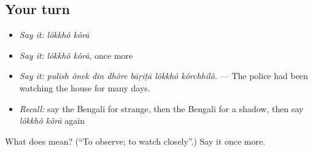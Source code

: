 \subsection*{Your turn}
\begin{itemize}
\raggedright
  \item \emph{Say it:} \emph{lôkkhô kôrā}
  \item \emph{Say it:} \emph{lôkkhô kôrā}, once more
  \item \emph{Say it:} \emph{pulish ônek din dhôre bāṛiṭā lôkkhô kôrchhilô.} — The police had been watching the house for many days.
  \item \emph{Recall:} say the Bengali for strange, then the Bengali for a shadow, then say \emph{lôkkhô kôrā} again
\end{itemize}

\begin{tcolorbox}[breakable,colback=teal!4,colframe=teal!35!black,title={Before you move on}]
What does   mean? (\textquotedblleft{}To observe; to watch closely\textquotedblright{}.) Say it once more.
\end{tcolorbox}
